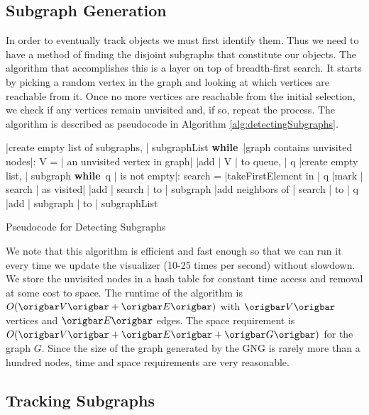 \documentclass{article}
\renewcommand{\|}{\origbar} %
\renewcommand{\WHILE}{\mbox{{\bf while} }\tab}
\begin{document}
\subsection{Subgraph Generation}

In order to eventually track objects we must first identify them. Thus we need to have a method of finding the disjoint subgraphs that constitute our objects. The algorithm that accomplishes this is a layer on top of breadth-first search. It starts by picking a random vertex in the graph and looking at which vertices are reachable from it. Once no more vertices are reachable from the initial selection, we check if any vertices remain unvisited and, if so, repeat the process. The algorithm is described as pseudocode in Algorithm \ref{alg:detectingSubgraphs}.

\begin{Algorithm}[h!]
\begin{program}
  |create empty list of subgraphs, | subgraphList 
  \WHILE |graph contains unvisited nodes|:
    V = | an unvisited vertex in graph|
    |add | V | to queue, | q
    |create empty list, | subgraph 
    \WHILE q | is not empty|:
      search = |takeFirstElement in | q 
      |mark | search | as visited|
      |add | search | to | subgraph
      |add neighbors of | search | to | q \untab
  |add | subgraph | to | subgraphList
\end{program}
\caption{Pseudocode for Detecting Subgraphs}
\label{alg:detectingSubgraphs}
\end{Algorithm}

We note that this algorithm is efficient and fast enough so that we can run it every time we update the visualizer (10-25 times per second) without slowdown. We store the unvisited nodes in a hash table for constant time access and removal at some cost to space. The runtime of the algorithm is $O(\|V\|+\|E\|)$ with $\|V\|$ vertices and $\|E\|$ edges. The space requirement is $O(\|V\|+\|E\|+\|G\|)$ for the graph $G$. Since the size of the graph generated by the GNG is rarely more than a hundred nodes, time and space requirements are very reasonable.

\subsection{Tracking Subgraphs}
\end{document}
